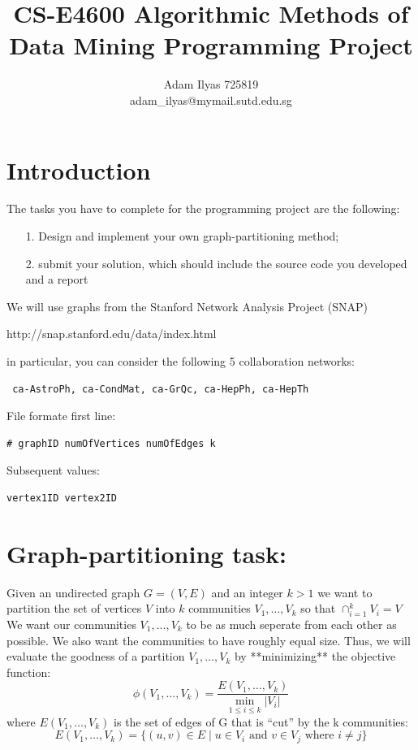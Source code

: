 \documentclass[a4paper,12pt]{article}
\author{Adam Ilyas 725819 \\adam\_ilyas@mymail.sutd.edu.sg}
\title{
  CS-E4600 Algorithmic Methods of Data Mining
  Programming Project
}
\begin{document}
\vspace{8pt}
\maketitle

\section{Introduction}

The tasks you have to complete for the programming project are the following:
\begin{itemize}
\item[1. ] Design and implement your own graph-partitioning method;
\item[2. ] submit your solution, which should include the source code you developed and a report
 
\end{itemize}

We will use graphs from the Stanford Network Analysis Project (SNAP)

http://snap.stanford.edu/data/index.html

in particular, you can consider the following 5 collaboration networks:

\begin{lstlisting}
 ca-AstroPh, ca-CondMat, ca-GrQc, ca-HepPh, ca-HepTh
\end{lstlisting}

File formate
first line:

\begin{lstlisting}
# graphID numOfVertices numOfEdges k
\end{lstlisting}

Subsequent values:
\begin{lstlisting}
vertex1ID vertex2ID  
\end{lstlisting}

\section{Graph-partitioning task:}

Given an undirected graph $G = (V, E)$ and an integer
$k > 1$  
we want to partition the set of vertices $V$ into $k$ communities  
$V_1 , \dots, V_k$ so that $\cap_{i=1}^k V_i = V$
We want our communities $V_1 , \dots, V_k$ to be as much seperate from each other as possible. We also want the communities to have roughly equal size. 
Thus, we will evaluate the goodness of
a partition $V_1 , \dots, V_k$ by **minimizing** the objective function:
$$\phi(V_1 , \dots, V_k) = \frac{E(V_1 , \dots, V_k)}{\min_{1 \leq i \leq k} |V_i|}$$
where $E(V_1 , \dots, V_k)$ is the set of edges of G that is “cut” by the k communities: 
$$E(V_1 , \dots, V_k) = \{ (u,v) \in E \;| \; u \in V_i \text{ and } v \in V_j \text{ where } i \neq j \}$$
\end{document}
